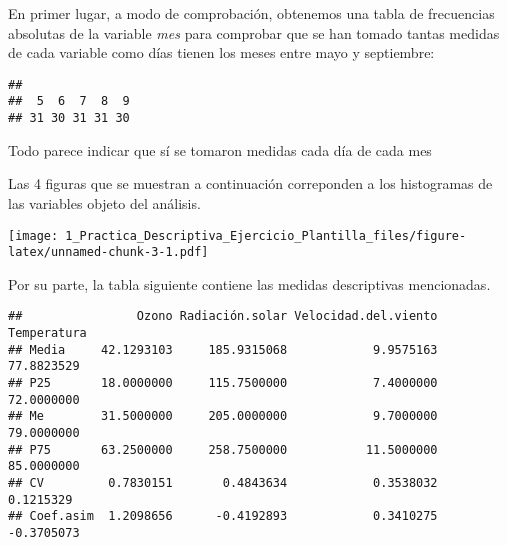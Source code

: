 \documentclass[
]{article}
\newenvironment{Shaded}{\begin{snugshade}}{\end{snugshade}}
\newcommand{\DataTypeTok}[1]{\textcolor[rgb]{0.13,0.29,0.53}{#1}}
\newcommand{\DecValTok}[1]{\textcolor[rgb]{0.00,0.00,0.81}{#1}}
\newcommand{\KeywordTok}[1]{\textcolor[rgb]{0.13,0.29,0.53}{\textbf{#1}}}
\newcommand{\NormalTok}[1]{#1}
\newcommand{\OperatorTok}[1]{\textcolor[rgb]{0.81,0.36,0.00}{\textbf{#1}}}
\newcommand{\StringTok}[1]{\textcolor[rgb]{0.31,0.60,0.02}{#1}}
\begin{document}
En primer lugar, a modo de comprobación, obtenemos una tabla de
frecuencias absolutas de la variable \emph{mes} para comprobar que se
han tomado tantas medidas de cada variable como días tienen los meses
entre mayo y septiembre:

\begin{verbatim}
## 
##  5  6  7  8  9 
## 31 30 31 31 30
\end{verbatim}

Todo parece indicar que sí se tomaron medidas cada día de cada mes

Las 4 figuras que se muestran a continuación correponden a los
histogramas de las variables objeto del análisis.

\begin{Shaded}
\end{Shaded}

\texttt{[image: 1\_Practica\_Descriptiva\_Ejercicio\_Plantilla\_files/figure-latex/unnamed-chunk-3-1.pdf]}

Por su parte, la tabla siguiente contiene las medidas descriptivas
mencionadas.

\begin{verbatim}
##                Ozono Radiación.solar Velocidad.del.viento Temperatura
## Media     42.1293103     185.9315068            9.9575163  77.8823529
## P25       18.0000000     115.7500000            7.4000000  72.0000000
## Me        31.5000000     205.0000000            9.7000000  79.0000000
## P75       63.2500000     258.7500000           11.5000000  85.0000000
## CV         0.7830151       0.4843634            0.3538032   0.1215329
## Coef.asim  1.2098656      -0.4192893            0.3410275  -0.3705073
\end{verbatim}
\end{document}
